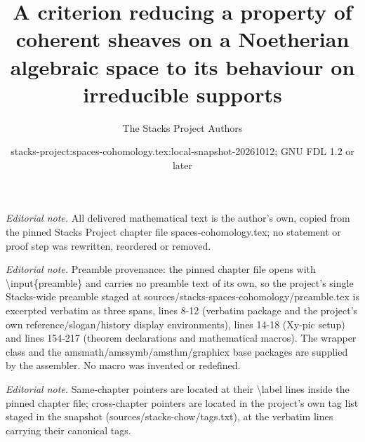 \documentclass[10pt,a4paper]{amsart}
\title{A criterion reducing a property of coherent sheaves on a Noetherian algebraic space to its behaviour on irreducible supports}
\author{The Stacks Project Authors}
\date{stacks-project:spaces-cohomology.tex:local-snapshot-20261012; GNU FDL 1.2 or later}
\theoremstyle{plain}
\theoremstyle{definition}
\theoremstyle{remark}
\numberwithin{equation}{subsection}
\begin{document}
\maketitle
\noindent\textit{Editorial note.} All delivered mathematical text is the author's own, copied from the pinned Stacks Project chapter file spaces-cohomology.tex; no statement or proof step was rewritten, reordered or removed.\par\medskip
\noindent\textit{Editorial note.} Preamble provenance: the pinned chapter file opens with \textbackslash{}input\{preamble\} and carries no preamble text of its own, so the project's single Stacks-wide preamble staged at sources/stacks-spaces-cohomology/preamble.tex is excerpted verbatim as three spans, lines 8-12 (verbatim package and the project's own reference/slogan/history display environments), lines 14-18 (Xy-pic setup) and lines 154-217 (theorem declarations and mathematical macros). The wrapper class and the amsmath/amssymb/amsthm/graphicx base packages are supplied by the assembler. No macro was invented or redefined.\par\medskip
\noindent\textit{Editorial note.} Same-chapter pointers are located at their \textbackslash{}label lines inside the pinned chapter file; cross-chapter pointers are located in the project's own tag list staged in the snapshot (sources/stacks-chow/tags.txt), at the verbatim lines carrying their canonical tags.\par\medskip
\end{document}
